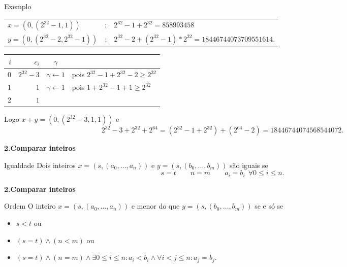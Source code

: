\documentclass{beamer}
\begin{document}
\begin{frame}{Exemplo}
\begin{tabular}{lcl}
$x=(0,(2^{32}-1, 1))$ &;    & {\tiny $2^{32}-1 + 2^{32} = 858993458$}\\
$y=(0, (2^{32}-2, 2^{32}-1))$ &;  &  {\tiny $2^{32}-2 + (2^{32}-1)*2^{32} = 18446744073709551614$.}
\end{tabular}
\begin{center}
\begin{tabular}{|r|r|c|l|}\hline
 $i$ & $c_i$ & $\gamma$ & \\\hline
$0$ & $2^{32}-3$ & $\gamma \leftarrow 1$ & pois $2^{32}-1 + 2^{32}-2 \geq 2^{32}  $\\\hline
$1$ & $1$ & $\gamma \leftarrow 1$ & pois $1+2^{32}-1 + 1 \geq 2^{32}  $\\\hline
$2$ & $1$ && \\\hline
\end{tabular}
\end{center}

Logo $x+y= (0, (2^{32}-3, 1,1))$ e 
$$ 2^{32}-3 + 2^{32} + 2^{64} = (2^{32}-1 + 2^{32} ) + (2^{64} - 2) = 18446744074568544072.$$

\end{frame}



\begin{frame}[fragile]{\bf 2.}{\bf Comparar inteiros}

\begin{block}{Igualdade}
 Dois inteiros $x=(s,(a_0,\ldots, a_n))$ e $y=(s,(b_0,\ldots, b_m))$ são iguais se
$$s=t \qquad n=m \qquad a_i=b_i \:\:\forall 0\leq i\leq n.$$
\end{block}
 
\end{frame}


\begin{frame}[fragile]{\bf 2.}{\bf Comparar inteiros}

\begin{block}{Ordem}
 O inteiro $x=(s,(a_0,\ldots, a_n))$ e menor do que $y=(s,(b_0,\ldots, b_m))$ se e só se
\begin{itemize}
 \item[] $s<t$ ou
 \item[] $(s=t) \wedge (n<m)$  ou 
 \item[] $(s=t) \wedge (n=m) \wedge \exists 0\leq i \leq n: a_i<b_i \wedge \forall i<j\leq n: a_j=b_j$.
\end{itemize}

\end{block}

\end{frame}
\end{document}
